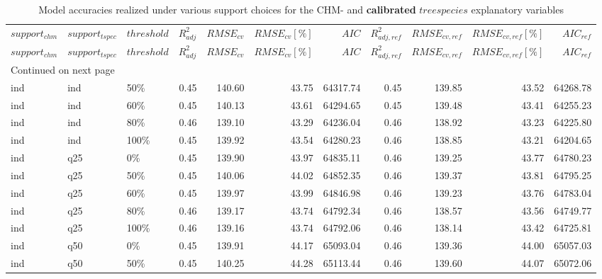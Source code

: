 \begingroup\fontsize{7pt}{8pt}\selectfont
\begin{longtable}{lllrrrrrrrr}
\caption{Model accuracies realized under various 
	support choices for the CHM- and \textbf{calibrated} $treespecies$ 
	explanatory variables}\\ \\
	\hline
	$support_{chm}$ & $support_{tspec}$ & $threshold$ & $R^2_{adj}$ & $RMSE_{cv}$ & $RMSE_{cv}[\%]$ & $AIC$ & $R^2_{adj, ref}$ & $RMSE_{cv, ref}$ & $RMSE_{cv, ref}[\%]$ & $AIC_{ref}$ \\ 
	\hline
	\endfirsthead
	\hline
	$support_{chm}$ & $support_{tspec}$ & $threshold$ & $R^2_{adj}$ & $RMSE_{cv}$ & $RMSE_{cv}[\%]$ & $AIC$ & $R^2_{adj, ref}$ & $RMSE_{cv, ref}$ & $RMSE_{cv, ref}[\%]$ & $AIC_{ref}$ \\ 
	\hline
	\endhead
	\hline
	\multicolumn{11}{l}{\footnotesize Continued on next page}
	\endfoot
	\endlastfoot
ind & ind & 0\% & 0.45 & 140.12 & 43.61 & 64291.15 & 0.45 & 139.71 & 43.48 & 64256.93 \\ 
  ind & ind & 50\% & 0.45 & 140.60 & 43.75 & 64317.74 & 0.45 & 139.85 & 43.52 & 64268.78 \\ 
  ind & ind & 60\% & 0.45 & 140.13 & 43.61 & 64294.65 & 0.45 & 139.48 & 43.41 & 64255.23 \\ 
  ind & ind & 80\% & 0.46 & 139.10 & 43.29 & 64236.04 & 0.46 & 138.92 & 43.23 & 64225.80 \\ 
  ind & ind & 100\% & 0.45 & 139.92 & 43.54 & 64280.23 & 0.46 & 138.85 & 43.21 & 64204.65 \\ 
  ind & q25 & 0\% & 0.45 & 139.90 & 43.97 & 64835.11 & 0.46 & 139.25 & 43.77 & 64780.23 \\ 
  ind & q25 & 50\% & 0.45 & 140.06 & 44.02 & 64852.35 & 0.46 & 139.37 & 43.81 & 64795.25 \\ 
  ind & q25 & 60\% & 0.45 & 139.97 & 43.99 & 64846.98 & 0.46 & 139.23 & 43.76 & 64783.04 \\ 
  ind & q25 & 80\% & 0.46 & 139.17 & 43.74 & 64792.34 & 0.46 & 138.57 & 43.56 & 64749.77 \\ 
  ind & q25 & 100\% & 0.46 & 139.16 & 43.74 & 64792.06 & 0.46 & 138.14 & 43.42 & 64725.81 \\ 
  ind & q50 & 0\% & 0.45 & 139.91 & 44.17 & 65093.04 & 0.46 & 139.36 & 44.00 & 65057.03 \\ 
  ind & q50 & 50\% & 0.45 & 140.25 & 44.28 & 65113.44 & 0.46 & 139.60 & 44.07 & 65072.06 \\ 

\end{longtable}
